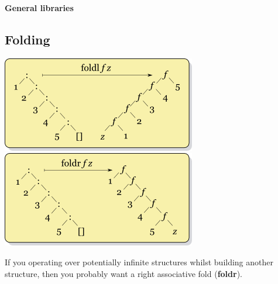 

\addtolength{\wpXoffset}{5.5cm}
\addtolength{\wpYoffset}{13.1cm}


\usepackage{float}





{\huge \bfseries General libraries \\[0.2cm]}

\HRule%

\begin{multicols}{2}

\begin{box1}
\subsection *{Folding}

\includegraphics[width=\linewidth/2,keepaspectratio=true]{images/foldl.png}
\includegraphics[width=\linewidth/2,keepaspectratio=true]{images/foldr.png}

If you operating over potentially infinite structures whilst building another
structure, then you probably want a right associative fold (\textbf{foldr}).


\end{box1}
\end{multicols}
